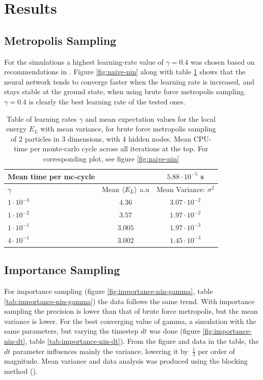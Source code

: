 \section{Results}
\subsection{Metropolis Sampling}
For the simulations a highest learning-rate value of $\gamma = 0.4$ was chosen based on recommendations in \cite{Marsland}.
Figure \ref{fig:naive-nin} along with table \ref{tab:naive-nin} shows that the neural network tends to converge faster when the learning rate is increased,
and stays stable at the ground state, when using brute force metropolis sampling. $\gamma = 0.4$ is clearly the best learning rate of the tested ones.
\begin{table}[h]
\begin{tabular}{l c c}
	Mean time per mc-cycle & &$5.88\cdot10^{-5}$ s \\
	\hline
	$\gamma$ & Mean $\langle E_L \rangle$ a.u & Mean Variance: $\sigma^2$\\
	\hline
	$1\cdot10^{-3}$ & $4.36$ & $3.07\cdot10^{-2}$ \\
	$1\cdot10^{-2}$ & $3.57$ & $1.97\cdot10^{-2}$ \\
	$1\cdot10^{-1}$ & $3.005$ & $1.97\cdot10^{-3}$ \\
	$4\cdot10^{-1}$ & $3.002$ & $1.45\cdot10^{-3}$ \\
\end{tabular}
\caption{Table of learning rates $\gamma$ and mean expectation values for the local energy $E_L$ with mean variance, for brute force metropolis sampling
		of 2 particles in 3 dimensions, with 4 hidden nodes.
		Mean CPU-time per monte-carlo cycle across all iterations at the top.
	For corresponding plot, see figure \ref{fig:naive-nin}}
\label{tab:naive-nin}
\end{table}

\subsection{Importance Sampling}
For importance sampling (figure \ref{fig:importance-nin-gamma}, table \ref{tab:importance-nin-gamma})
the data follows the same trend. With importance sampling the precision is lower than that of brute
force metropolis, but the mean variance is lower.
For the best converging value of gamma, a simulation with the same parameters, but varying the
timestep $dt$ was done (figure \ref{fig:importance-nin-dt}, table \ref{tab:importance-nin-dt}).
From the figure and data in the table, the $dt$ parameter influences mainly the variance,
lowering it by $~\frac{1}{3}$ per order of magnitude.
Mean variance and data analysis was produced using the blocking method (\cite{Lectures-blocking}).

